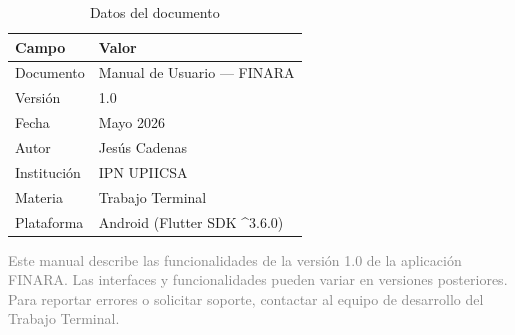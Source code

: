 \documentclass[a4paper,12pt]{report}
\begin{document}
\begin{table}[H]
  \centering
  \caption{Datos del documento}
  \label{tab:info-documento}
  \begin{tabular}{ll}
    \toprule
    \textbf{Campo} & \textbf{Valor} \\
    \midrule
    Documento   & Manual de Usuario — FINARA \\
    Versión     & 1.0 \\
    Fecha       & Mayo 2026 \\
    Autor       & Jesús Cadenas \\
    Institución & IPN UPIICSA \\
    Materia     & Trabajo Terminal \\
    Plataforma  & Android (Flutter SDK \textasciicircum 3.6.0) \\
    \bottomrule
  \end{tabular}
\end{table}

\vspace{1em}
\textcolor{gray}{\footnotesize
  Este manual describe las funcionalidades de la versión 1.0 de la
  aplicación FINARA. Las interfaces y funcionalidades pueden variar en
  versiones posteriores. Para reportar errores o solicitar soporte,
  contactar al equipo de desarrollo del Trabajo Terminal.
}
\end{document}
